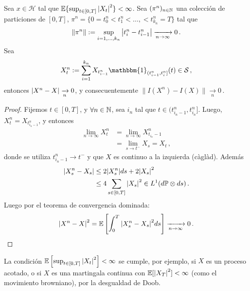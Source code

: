 \begin{proposition}
Sea $x \in \mathcal{H}$ tal que $\mathbb{E}\{ \sup_{t \in [0,T]} \abs{X_t}^2 \} < \infty$. Sea $(\pi^n)_{n \in \mathbb{N}}$ una colección de particiones de $[0,T]$, $\pi^{n} = \{ 0= t_0^{n}< t_{1}^n< \ldots, < t_{k_n}^{n} = T\}$ tal que 
\begin{equation*}
    \|\pi^n\| := \sup_{i = 1, \ldots, k_n} \abs{t_i^n - t_{i-1}^{n}} \xrightarrow[n \to \infty]{} 0 \,.
\end{equation*}
Sea
\begin{equation*}
    X_t^n := \sum_{i=1}^{k_n} X_{t_{i-1}^n} \mathbbm{1}_{(t_{i-1}^n, t_{i}^{n}]}(t) \in \mathcal{S}\,,
\end{equation*}
entonces $\abs{X^n - X} \xrightarrow[n]{} 0$, y consecuentemente $\|I(X^n) - I(X)\| \xrightarrow[n]{} 0$\,.
\end{proposition}
\begin{proof}
\gris
Fijemos $t \in [0,T]$, y $\forall n \in \mathbb{N}$, sea $i_n$ tal que $t \in (t_{i_n -1}^n, t_{i_n}^n]$. 
Luego, $X_{t}^{n} = X_{t_{i_n -1}^n}$, y entonces 
\begin{align*}
        \lim_{n \to \infty} X_{t}^{n} 
        &= \lim_{n \to \infty} X_{t_{i_n} - 1}^n \\
        &= \lim_{s \to t^{-}} X_s = X_t \,,
\end{align*}
donde se utiliza $t_{i_n - 1}^n \to t^{-}$ y que $X$ es continuo a la izquierda (càglàd). Además 
\begin{align*}
        \abs{X^n_s - X_s} 
        &\le 2 \abs{X_{s}^n} ds + 2 \abs{X_s}^2\\
        &\le 4 \sum_{s \in [0,T]} \abs{X_s}^2 \in L^{1}(d\mathbb{P} \otimes ds) \,.
\end{align*}
Luego por el teorema de convergencia dominada:
\begin{equation*}
    \abs{X^n - X}^2 = \mathbb{E}\left[ \int_{0}^{T} \abs{X_s^n - X_s}^2 ds \right] \xrightarrow[n \to \infty]{}  0\,.
\end{equation*}
\findem
\negro
\end{proof}
\begin{remark}
La condición $\mathbb{E} \left[ \sup_{t \in [0,T]} \abs{X_t}^2 \right] < \infty$ se cumple, por ejemplo, si $X$ es un proceso acotado, o si $X$ es una martingala continua con $\mathbb{E} [\abs{X_T}^2] < \infty$ (como el movimiento browniano), por la desgualdad de Doob.
\end{remark}

